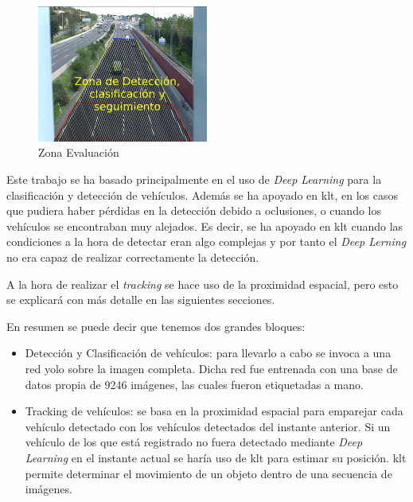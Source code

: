 \begin{figure}[H] 
\begin{center}
	\includegraphics[width=0.5\textwidth]{figures/Diseno_global/nueva_zona.png}
   \caption{Zona Evaluación}
	\label{fig.nueva_zona}
\end{center}
\end{figure}


Este trabajo se ha basado principalmente en el uso de \textit{Deep Learning} para la clasificación y detección de vehículos. Además se ha apoyado en \acrfull{klt}, en los casos que pudiera haber pérdidas en la detección debido a oclusiones, o cuando los vehículos se encontraban muy alejados. Es decir, se ha apoyado en \acrshort{klt} cuando las condiciones a la hora de detectar eran algo complejas y por tanto el \textit{Deep Lerning} no era capaz de realizar correctamente la detección.

A la hora de realizar el \textit{tracking} se hace uso de la proximidad espacial, pero esto se explicará con más detalle en las siguientes secciones.


En resumen se puede decir que tenemos dos grandes bloques:
\begin{itemize}
    \item Detección y Clasificación de vehículos: para llevarlo a cabo se invoca a una red \acrshort{yolo} sobre la imagen completa. Dicha red fue entrenada con una base de datos propia de 9246 imágenes, las cuales fueron etiquetadas a mano.   
    \item Tracking de vehículos: se basa en la proximidad espacial para emparejar cada vehículo detectado con los vehículos detectados del instante anterior. Si un vehículo de los que está registrado no fuera detectado mediante \textit{Deep Learning} en el instante actual se haría uso de \acrshort{klt} para estimar su posición. \acrshort{klt} permite determinar el movimiento de un objeto dentro de una secuencia de imágenes.
\end{itemize}

